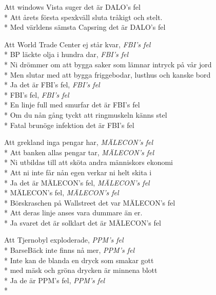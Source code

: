 \begin{SongText}
\begin{SongVerse}
    Att windows Vista suger det är DALO's fel\\*%
    Att årets första spexkväll sluta tråkigt och stelt.\\*%
    Med världens sämsta Capsring det är DALO's fel
\end{SongVerse}
\begin{SongVerse}
    Att World Trade Center ej står kvar, \textit{FBI's fel}\\*%
    BP läckte olja i hundra dar, \textit{FBI's fel}\\*%
    Ni drömmer om att bygga saker som lämnar intryck på vår jord\\*%
    Men slutar med att bygga friggebodar, lusthus och kanske bord\\*%
    Ja det är FBI's fel, \textit{FBI's fel}\\*%
    FBI's fel, \textit{FBI's fel}\\*%
    En linje full med smurfar det är FBI's fel\\*%
    Om du nån gång tyckt att ringmuskeln känns stel\\*%
    Fatal brunöge infektion det är FBI's fel
\end{SongVerse}
\begin{SongVerse}
    Att grekland inga pengar har, \textit{MÄLECON's fel}\\*%
    Att banken allas pengar tar, \textit{MÄLECON's fel}\\*%
    Ni utbildas till att sköta andra människors ekonomi\\*%
    Att ni inte får nån egen verkar ni helt skita i\\*%
    Ja det är MÄLECON's fel, \textit{MÄLECON's fel}\\*%
    MÄLECON's fel, \textit{MÄLECON's fel}\\*%
    Börskraschen på Wallstreet det var MÄLECON's fel\\*%
    Att deras linje anses vara dummare än er.\\*%
    Ja svaret det är solklart det är MÄLECON's fel
\end{SongVerse}
\begin{SongVerse}
    Att Tjernobyl exploderade, \textit{PPM's fel}\\*%
    BarseBäck inte finns nå mer, \textit{PPM's fel}\\*%
    Inte kan de blanda en dryck som smakar gott\\*%
    med mäsk och gröna drycken är minnena blott\\*%
    Ja de är PPM's fel, \textit{PPM's fel}\\*%

\end{SongVerse}
\end{SongText}
